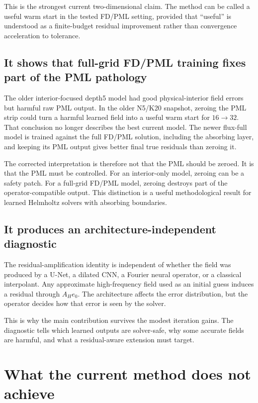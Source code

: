 This is the strongest current two-dimensional claim. The method can be called
a useful warm start in the tested FD/PML setting, provided that ``useful'' is
understood as a finite-budget residual improvement rather than convergence
acceleration to tolerance.

\subsection{It shows that full-grid FD/PML training fixes part of the PML pathology}
\label{subsec:discussion-pml-fix}

The older interior-focused depth5 model had good physical-interior field
errors but harmful raw PML output. In the older N5/K20 snapshot, zeroing the
PML strip could turn a harmful learned field into a useful warm start for
$16\to32$. That conclusion no longer describes the best current model. The
newer flux-full model is trained against the full FD/PML solution, including
the absorbing layer, and keeping its PML output gives better final true
residuals than zeroing it.

The corrected interpretation is therefore not that the PML should be zeroed.
It is that the PML must be controlled. For an interior-only model, zeroing can
be a safety patch. For a full-grid FD/PML model, zeroing destroys part of the
operator-compatible output. This distinction is a useful methodological result
for learned Helmholtz solvers with absorbing boundaries.

\subsection{It produces an architecture-independent diagnostic}
\label{subsec:discussion-diagnostic}

The residual-amplification identity is independent of whether the field was
produced by a U-Net, a dilated CNN, a Fourier neural operator, or a classical
interpolant. Any approximate high-frequency field used as an initial guess
induces a residual through $A_H e_0$. The architecture affects the error
distribution, but the operator decides how that error is seen by the solver.

This is why the main contribution survives the modest iteration gains. The
diagnostic tells which learned outputs are solver-safe, why some accurate
fields are harmful, and what a residual-aware extension must target.

\section{What the current method does not achieve}
\label{sec:discussion-what-fails}

